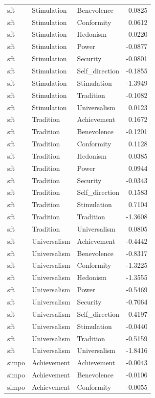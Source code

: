 \begin{tabular}{lllr}
sft & Stimulation & Benevolence & -0.0825 \\
sft & Stimulation & Conformity & 0.0612 \\
sft & Stimulation & Hedonism & 0.0220 \\
sft & Stimulation & Power & -0.0877 \\
sft & Stimulation & Security & -0.0801 \\
sft & Stimulation & Self\_direction & -0.1855 \\
sft & Stimulation & Stimulation & -1.3949 \\
sft & Stimulation & Tradition & -0.1082 \\
sft & Stimulation & Universalism & 0.0123 \\
sft & Tradition & Achievement & 0.1672 \\
sft & Tradition & Benevolence & -0.1201 \\
sft & Tradition & Conformity & 0.1128 \\
sft & Tradition & Hedonism & 0.0385 \\
sft & Tradition & Power & 0.0944 \\
sft & Tradition & Security & -0.0343 \\
sft & Tradition & Self\_direction & 0.1583 \\
sft & Tradition & Stimulation & 0.7104 \\
sft & Tradition & Tradition & -1.3608 \\
sft & Tradition & Universalism & 0.0805 \\
sft & Universalism & Achievement & -0.4442 \\
sft & Universalism & Benevolence & -0.8317 \\
sft & Universalism & Conformity & -1.3225 \\
sft & Universalism & Hedonism & -1.3555 \\
sft & Universalism & Power & -0.5469 \\
sft & Universalism & Security & -0.7064 \\
sft & Universalism & Self\_direction & -0.4197 \\
sft & Universalism & Stimulation & -0.0440 \\
sft & Universalism & Tradition & -0.5159 \\
sft & Universalism & Universalism & -1.8416 \\
simpo & Achievement & Achievement & -0.0043 \\
simpo & Achievement & Benevolence & -0.0106 \\
simpo & Achievement & Conformity & -0.0055 \\

\end{tabular}
